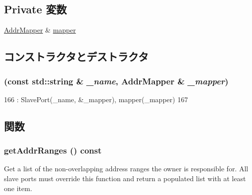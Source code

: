 \subsection*{Private 変数}
\begin{DoxyCompactItemize}
\item 
\hyperlink{classAddrMapper_1_1AddrMapper}{AddrMapper} \& \hyperlink{classAddrMapper_1_1MapperSlavePort_a85ab1c024f81c47e0a2c4e4261eabfb4}{mapper}
\end{DoxyCompactItemize}


\subsection{コンストラクタとデストラクタ}
\hypertarget{classAddrMapper_1_1MapperSlavePort_aefcc8bd233b4c0e73a6cffe788ace480}{
\subsubsection[{MapperSlavePort}]{ (const std::string \& {\em \_\-name}, \/  {\bf AddrMapper} \& {\em \_\-mapper})}}
\label{classAddrMapper_1_1MapperSlavePort_aefcc8bd233b4c0e73a6cffe788ace480}



\begin{DoxyCode}
166             : SlavePort(_name, &_mapper), mapper(_mapper)
167         { }
\end{DoxyCode}


\subsection{関数}
\hypertarget{classAddrMapper_1_1MapperSlavePort_a36cf113d5e5e091ebddb32306c098fae}{
\subsubsection[{getAddrRanges}]{ getAddrRanges () const}}
\label{classAddrMapper_1_1MapperSlavePort_a36cf113d5e5e091ebddb32306c098fae}
Get a list of the non-\/overlapping address ranges the owner is responsible for. All slave ports must override this function and return a populated list with at least one item.

